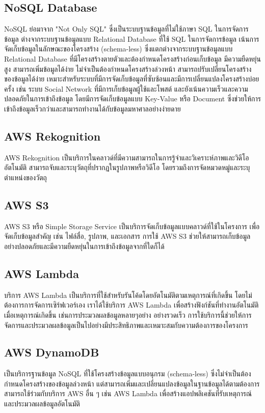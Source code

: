 \subsection{NoSQL Database}
NoSQL ย่อมาจาก "Not Only SQL" ซึ่งเป็นระบบฐานข้อมูลที่ไม่ใช้ภาษา SQL ในการจัดการข้อมูล ต่างจากระบบฐานข้อมูลแบบ Relational Database ที่ใช้ SQL ในการจัดการข้อมูล
เน้นการจัดเก็บข้อมูลในลักษณะของโครงสร้าง (schema-less) ซึ่งแตกต่างจากระบบฐานข้อมูลแบบ Relational Database ที่มีโครงสร้างตายตัวและต้องกำหนดโครงสร้างก่อนเก็บข้อมูล
มีความยืดหยุ่นสูง สามารถเพิ่มข้อมูลได้ง่าย ไม่จำเป็นต้องกำหนดโครงสร้างล่วงหน้า สามารถปรับเปลี่ยนโครงสร้างของข้อมูลได้ง่าย เหมาะสำหรับระบบที่มีการจัดเก็บข้อมูลที่ซับซ้อนและมีการเปลี่ยนแปลงโครงสร้างบ่อยครั้ง เช่น ระบบ Social Network ที่มีการเก็บข้อมูลผู้ใช้และโพสต์
และยังเน้นความเร็วและความปลอดภัยในการเข้าถึงข้อมูล โดยมีการจัดเก็บข้อมูลแบบ Key-Value หรือ Document ซึ่งช่วยให้การเข้าถึงข้อมูลเร็วกว่าและสามารถทำงานได้กับข้อมูลมหาศาลอย่างง่ายดาย\cite{NoSQL}

\subsection{AWS Rekognition}
AWS Rekognition เป็นบริการในคลาวด์ที่มีความสามารถในการรู้จำและวิเคราะห์ภาพและวิดีโออัตโนมัติ สามารถจับและระบุวัตถุที่ปรากฏในรูปภาพหรือวิดีโอ โดยรวมถึงการจัดหมวดหมู่และระบุตำแหน่งของวัตถุ

\subsection{AWS S3}
AWS S3 หรือ Simple Storage Service เป็นบริการจัดเก็บข้อมูลแบบคลาวด์ที่ใช้ในโครงการ เพื่อจัดเก็บข้อมูลสำคัญ เช่น ไฟล์สื่อ, รูปภาพ, และเอกสาร การใช้ AWS S3 ช่วยให้สามารถเก็บข้อมูลอย่างปลอดภัยและมีความยืดหยุ่นในการเข้าถึงข้อมูลจากที่ใดก็ได้

\subsection{AWS Lambda}
บริการ AWS Lambda เป็นบริการที่ใช้สำหรับรันโค้ดโดยอัตโนมัติตามเหตุการณ์ที่เกิดขึ้น โดยไม่ต้องการการจัดการเซิร์ฟเวอร์เอง เราได้ใช้บริการ AWS Lambda เพื่อสร้างฟังก์ชันที่ทำงานอัตโนมัติเมื่อเหตุการณ์เกิดขึ้น เช่นการประมวลผลข้อมูลหลายๆอย่าง อย่างรวดเร็ว การใช้บริการนี้ช่วยให้การจัดการและประมวลผลข้อมูลเป็นไปอย่างมีประสิทธิภาพและเหมาะสมกับความต้องการของโครงการ

\subsection{AWS DynamoDB}
เป็นบริการฐานข้อมูล NoSQL ที่ใช้โครงสร้างข้อมูลแบบอนุกรม (schema-less) ซึ่งไม่จำเป็นต้องกำหนดโครงสร้างของข้อมูลล่วงหน้า แต่สามารถเพิ่มและเปลี่ยนแปลงข้อมูลในฐานข้อมูลได้ตามต้องการ สามารถใช้ร่วมกับบริการ AWS อื่น ๆ เช่น AWS Lambda เพื่อสร้างแอปพลิเคชันที่รับเหตุการณ์และประมวลผลข้อมูลอัตโนมัติ

